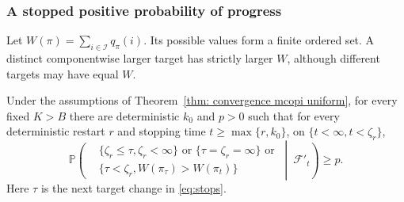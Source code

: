\subsubsection{A stopped positive probability of progress}
Let $W(\pi)=\sum_{i\in\mathcal I}q_\pi(i)$. Its possible values form a finite ordered set. A distinct componentwise larger target has strictly larger $W$, although different targets may have equal
$W$.

\begin{lemma}\label{thm: fixed prob that bad actions dont become greedy}
Under the assumptions of Theorem~\ref{thm: convergence mcopi uniform}, for
every fixed $K>B$ there are deterministic $k_0$ and $p>0$ such that for every deterministic
restart $r$ and stopping time $t\ge\max\{r,k_0\}$, on $\{t<\infty,t<\zeta_r\}$,
\begin{equation}\label{eq:progress}
\mathbb P\!\left(
\begin{aligned}
&\{\zeta_r\le\tau,\zeta_r<\infty\}\text{ or }\{\tau=\zeta_r=\infty\}\text{ or}\\
&\{\tau<\zeta_r,W(\pi_\tau)>W(\pi_t)\}
\end{aligned}
\ \middle|\ \mathcal F'_t\right)\ge p.
\end{equation}
Here $\tau$ is the next target change in \eqref{eq:stops}.
\end{lemma}
